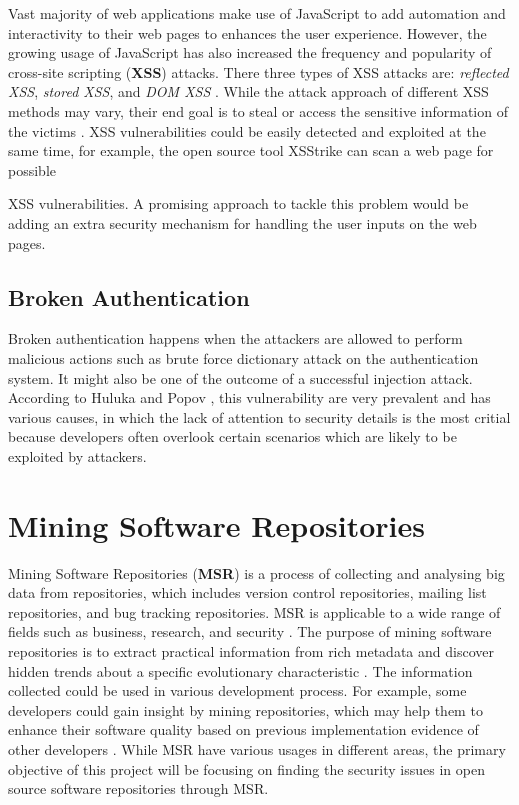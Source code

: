 \documentclass[12pt, a4paper]{report}
\begin{document}
Vast majority of web applications make use of JavaScript to add automation and interactivity to
their web pages to enhances the user experience. However, the growing usage of JavaScript has also
increased the frequency and popularity of cross-site scripting (\textbf{XSS}) attacks. There three
types of XSS attacks are: \textit{reflected XSS}, \textit{stored XSS}, and \textit{DOM XSS}
\cite{kieyzun_2009}. While the attack approach of different XSS methods may vary, their end goal is
to steal or access the sensitive information of the victims \cite{vogt_2007}. XSS vulnerabilities
could be easily detected and exploited at the same time, for example, the open source tool XSStrike
\cite{xsstrike} can scan a web page for possible {XSS vulnerabilities. A promising approach to
tackle this problem would be adding an extra security mechanism for handling the user inputs on the
web pages.

\subsection{Broken Authentication} \label{subsec:authentication}
Broken authentication happens when the attackers are allowed to perform malicious actions such as
brute force dictionary attack on the authentication system. It might also be one of the outcome of a
successful injection attack. According to Huluka and Popov \cite{huluka_2012}, this vulnerability
are very prevalent and has various causes, in which the lack of attention to security details is the
most critial because developers often overlook certain scenarios which are likely to be exploited by
attackers.

\section{Mining Software Repositories}
Mining Software Repositories (\textbf{MSR}) is a process of collecting and analysing big data from
repositories, which includes version control repositories, mailing list repositories, and bug
tracking repositories. MSR is applicable to a wide range of fields such as business, research, and
security \cite{poncin_2011}. The purpose of mining software repositories is to extract practical
information from rich metadata and discover hidden trends about a specific evolutionary
characteristic \cite{kagdi_2007}. The information collected could be used in various development
process. For example, some developers could gain insight by mining repositories, which may help them
to enhance their software quality based on previous implementation evidence of other developers
\cite{hassan_2008}. While MSR have various usages in different areas, the primary objective of this
project will be focusing on finding the security issues in open source software repositories through
MSR.

}
\end{document}
